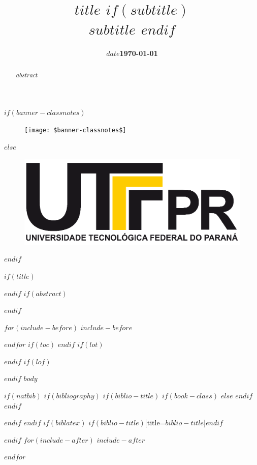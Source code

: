 \documentclass[$if(fontsize)$$fontsize$,$endif$$if(lang)$$lang$,$endif$$if(papersize)$$papersize$,$endif$$for(classoption)$$classoption$$sep$,$endfor$]{$documentclass$}
\title{
    $title$
    $if(subtitle)$
      \\\vspace{0.3em}
      \large \emph{$subtitle$}
    $endif$
  }
\author{
  $for(author)$
    \normalsize\textbf{$author.name$}\footnotesize$$^$author.id$$$\vspace{0.05in} \\
    \footnotesize$$^$author.id$$$\normalsize\emph{$author.affiliation$} \\
    \normalsize \emph{$author.department$} \\
    \footnotesize \hspace{1.5cm}\texttt{\url{$author.email$}} 
    \newline \vspace*{-0.1cm} $sep$ \and
  $endfor$
}
\date{\footnotesize \textbf{$date$}}
\date{\footnotesize \textbf{\today}}
\begin{document}
$if(banner-classnotes)$
\begin{figure}
  \centering
  \vspace{-1.5cm}
  \texttt{[image: \$banner-classnotes\$]}
  \vspace{-1.0cm}
\end{figure}
$else$
  \begin{figure}
  \centering
  \vspace{-1.0cm}
  \includegraphics[trim=0.0cm 22cm 0.0cm 0.0cm, width=1.0\linewidth]{../templates/logos/logo-utfpr.png}
  \vspace{-1.5cm}
\end{figure}    
$endif$

$if(title)$
\maketitle
$endif$
$if(abstract)$
\begin{abstract}
$abstract$
\end{abstract}
$endif$

$for(include-before)$
$include-before$

$endfor$
$if(toc)$
{
\hypersetup{linkcolor=$if(toccolor)$$toccolor$$else$black$endif$}
\setcounter{tocdepth}{$toc-depth$}
\tableofcontents
}
$endif$
$if(lot)$
\listoftables
$endif$
$if(lof)$
\listoffigures
$endif$
$body$

$if(natbib)$
$if(bibliography)$
$if(biblio-title)$
$if(book-class)$
\renewcommand\bibname{$biblio-title$}
$else$
\renewcommand\refname{$biblio-title$}
$endif$
$endif$


$endif$
$endif$
$if(biblatex)$
\printbibliography$if(biblio-title)$[title=$biblio-title$]$endif$

$endif$
$for(include-after)$
$include-after$

$endfor$
\end{document}

